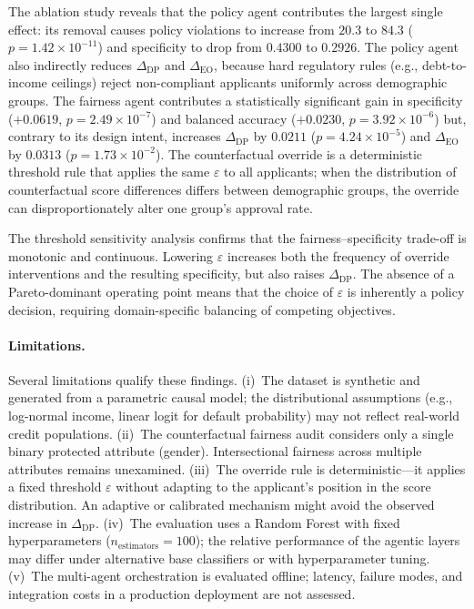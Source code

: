 The ablation study reveals that the policy agent contributes the largest
single effect: its removal causes policy violations to increase from $20.3$
to $84.3$ ($p = 1.42 \times 10^{-11}$) and specificity to drop from
$0.4300$ to $0.2926$. The policy agent also indirectly reduces
$\Delta_{\text{DP}}$ and $\Delta_{\text{EO}}$, because hard regulatory rules
(e.g., debt-to-income ceilings) reject non-compliant applicants uniformly
across demographic groups. The fairness agent contributes a statistically
significant gain in specificity ($+0.0619$, $p = 2.49 \times 10^{-7}$) and
balanced accuracy ($+0.0230$, $p = 3.92 \times 10^{-6}$) but, contrary to
its design intent, increases $\Delta_{\text{DP}}$ by $0.0211$
($p = 4.24 \times 10^{-5}$) and $\Delta_{\text{EO}}$ by $0.0313$
($p = 1.73 \times 10^{-2}$). The counterfactual override is a deterministic
threshold rule that applies the same $\varepsilon$ to all applicants; when
the distribution of counterfactual score differences differs between
demographic groups, the override can disproportionately alter one group's
approval rate.

The threshold sensitivity analysis confirms that the fairness--specificity
trade-off is monotonic and continuous. Lowering $\varepsilon$ increases both
the frequency of override interventions and the resulting specificity, but
also raises $\Delta_{\text{DP}}$. The absence of a Pareto-dominant operating
point means that the choice of $\varepsilon$ is inherently a policy
decision, requiring domain-specific balancing of competing objectives.

\paragraph{Limitations.}
Several limitations qualify these findings.
(i)~The dataset is synthetic and generated from a parametric causal model;
the distributional assumptions (e.g., log-normal income, linear logit for
default probability) may not reflect real-world credit populations.
(ii)~The counterfactual fairness audit considers only a single binary
protected attribute (gender). Intersectional fairness across multiple
attributes remains unexamined.
(iii)~The override rule is deterministic---it applies a fixed threshold
$\varepsilon$ without adapting to the applicant's position in the score
distribution. An adaptive or calibrated mechanism might avoid the observed
increase in $\Delta_{\text{DP}}$.
(iv)~The evaluation uses a Random Forest with fixed hyperparameters
($n_{\text{estimators}} = 100$); the relative performance of the agentic
layers may differ under alternative base classifiers or with hyperparameter
tuning.
(v)~The multi-agent orchestration is evaluated offline; latency, failure
modes, and integration costs in a production deployment are not assessed.
